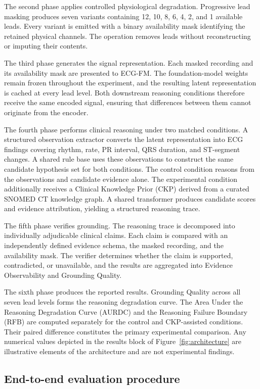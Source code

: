 \documentclass{ssnreview}
\begin{document}
The second phase applies controlled physiological degradation. Progressive lead masking
produces seven variants containing 12, 10, 8, 6, 4, 2, and 1 available leads. Every variant
is emitted with a binary availability mask identifying the retained physical channels.
The operation removes leads without reconstructing or imputing their contents.

The third phase generates the signal representation. Each masked recording and its
availability mask are presented to ECG-FM. The foundation-model weights remain frozen
throughout the experiment, and the resulting latent representation is cached at every lead
level. Both downstream reasoning conditions therefore receive the same encoded signal,
ensuring that differences between them cannot originate from the encoder.

The fourth phase performs clinical reasoning under two matched conditions. A structured
observation extractor converts the latent representation into ECG findings covering
rhythm, rate, PR interval, QRS duration, and ST-segment changes. A shared rule base uses
these observations to construct the same candidate hypothesis set for both conditions.
The control condition reasons from the observations and candidate evidence alone. The
experimental condition additionally receives a Clinical Knowledge Prior (CKP) derived
from a curated SNOMED CT knowledge graph. A shared transformer produces candidate
scores and evidence attribution, yielding a structured reasoning trace.

The fifth phase verifies grounding. The reasoning trace is decomposed into individually
adjudicable clinical claims. Each claim is compared with an independently defined
evidence schema, the masked recording, and the availability mask. The verifier determines
whether the claim is supported, contradicted, or unavailable, and the results are
aggregated into Evidence Observability and Grounding Quality.

The sixth phase produces the reported results. Grounding Quality across all seven lead
levels forms the reasoning degradation curve. The Area Under the Reasoning Degradation
Curve (AURDC) and the Reasoning Failure Boundary (RFB) are computed separately for
the control and CKP-assisted conditions. Their paired difference constitutes the primary
experimental comparison. Any numerical values depicted in the results block of
Figure~\ref{fig:architecture} are illustrative elements of the architecture and are not
experimental findings.

\subsection*{End-to-end evaluation procedure}
\end{document}
